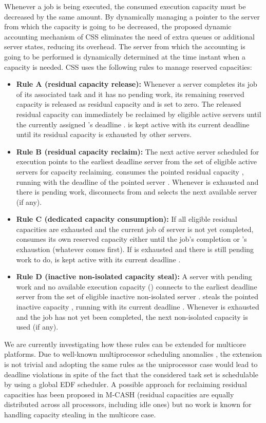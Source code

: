 \documentclass[10pt,twocolumn]{article}
\begin{document}
Whenever a job is being executed, the consumed execution capacity must be decreased by the same amount. By dynamically managing a pointer to the server from which the capacity is going to be decreased, the proposed dynamic accounting mechanism of CSS eliminates the need of extra queues or additional server states, reducing its overhead. The server from which the accounting is going to be performed is dynamically determined at the time instant when a capacity is needed. CSS uses the following rules to manage reserved capacities:

\begin{itemize}
\item\textbf{Rule A (residual capacity release):} Whenever a server  completes its  job of its associated task  and it has no pending work, its remaining reserved capacity  is released as residual capacity  and  is set to zero. The released residual capacity  can immediately be reclaimed by eligible active servers until the currently assigned 's deadline .  is kept active with its current deadline until its residual capacity  is exhausted by other servers.
\item\textbf{Rule B (residual capacity reclaim):} The next active server  scheduled for execution points to the earliest deadline server  from the set of eligible active servers  for capacity reclaiming.  consumes the pointed residual capacity , running with the deadline  of the pointed server . Whenever  is exhausted and there is pending work,  disconnects from  and selects the next available server  (if any).
\item\textbf{Rule C (dedicated capacity consumption):} If all eligible residual capacities are exhausted and the current  job of server  is not yet completed,  consumes its own reserved capacity  either until the job's completion or 's exhaustion (whatever comes first). If  is exhausted and there is still pending work to do,  is kept active with its current deadline .
\item\textbf{Rule D (inactive non-isolated capacity steal):} A server  with pending work and no available execution capacity () connects to the earliest deadline server  from the set of eligible inactive non-isolated server .  steals the pointed inactive capacity , running with its current deadline . Whenever  is exhausted and the job has not yet been completed, the next non-isolated capacity  is used (if any). 
\end{itemize}

We are currently investigating how these rules can be extended for multicore platforms. Due to well-known multiprocessor scheduling anomalies \cite{andersson02}, the extension is not trivial and adopting the same rules as the uniprocessor case would lead to deadline violations in spite of the fact that the considered task set is schedulable by using a global EDF scheduler. A possible approach for reclaiming residual capacities has been proposed in M-CASH \cite{pellizzoni08} (residual capacities are equally distributed across all processors, including idle ones) but no work is known for handling capacity stealing in the multicore case. 
\end{document}
